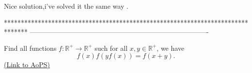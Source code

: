\begin{mysolution}
	Nice solution,i've solved it the same way .
\end{mysolution}
*******************************************************************************
-------------------------------------------------------------------------------

\begin{problem}
	Find all functions $ f: \mathbb R^{+}\rightarrow \mathbb R^{+}$ such for all $ x,y \in \mathbb R^{+}$, we have
\[ f(x)f(yf(x))=f(x+y).\]
	\flushright \href{https://artofproblemsolving.com/community/c6h161649}{(Link to AoPS)}
\end{problem}



